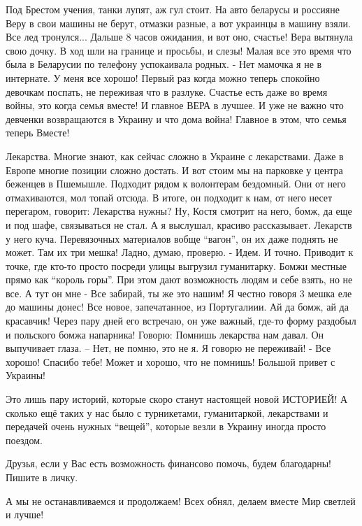 Под Брестом учения, танки лупят, аж гул стоит. На авто беларусы и россияне Веру
в свои машины не берут, отмазки разные, а вот украинцы в машину взяли. Все лед
тронулся... Дальше 8 часов ожидания, и вот оно, счастье! Вера вытянула свою
дочку.  В ход шли  на границе и  просьбы, и слезы!  Малая все это время что
была в Беларусии по телефону успокаивала родных. - Нет мамочка я не в
интернате. У меня все хорошо! Первый раз когда можно теперь спокойно девочкам
поспать, не переживая что в разлуке.  Счастье есть даже во время войны, это
когда семья вместе! И главное ВЕРА в лучшее. И уже не важно что девченки
возвращаются в Украину и что дома война! Главное в этом, что семья теперь
Вместе!

Лекарства. Многие знают, как сейчас сложно  в Украине с лекарствами. Даже в
Европе многие позиции сложно достать. И вот стоим мы на парковке у центра
беженцев в Пшемышле. Подходит рядом к волонтерам бездомный. Они от него
отмахиваются, мол топай отсюда. В итоге, он подходит к нам, от него несет
перегаром, говорит: Лекарства нужны? Ну, Костя смотрит на него, бомж, да еще и
под шафе, связываться не стал. А я выслушал, красиво рассказывает. Лекарств у
него куча. Перевязочных материалов вобще \enquote{вагон}, он их даже поднять не
может.  Там их три мешка! Ладно, думаю, проверю. - Идем. И точно. Приводит к
точке, где кто-то просто посреди улицы выгрузил гуманитарку. Бомжи местные
прямо как \enquote{король горы}. При этом дают возможность людям и себе взять,
но не все. А тут он мне - Все забирай, ты же это нашим! Я честно говоря 3 мешка
еле до машины донес! Все новое, запечатанное, из Португалиии. Ай да бомж, ай да
красавчик!  Через пару дней его встречаю, он уже важный, где-то форму раздобыл
и польского бомжа напарника! Говорю: Помнишь лекарства нам давал. Он
выпучивает глаза. – Нет, не помню, это не я. Я говорю не переживай! - Все
хорошо!  Спасибо тебе!
Может и хорошо, что не помнишь! Большой привет с Украины!

Это лишь пару историй, которые скоро станут настоящей новой  ИСТОРИЕЙ! А
сколько ещё таких у нас  было с турникетами, гуманитаркой, лекарствами и
передачей очень нужных \enquote{вещей},  которые везли в Украину иногда просто
поездом.

Друзья, если у Вас есть возможность финансово помочь, будем благодарны! Пишите в личку.

А мы  не останавливаемся  и продолжаем! Всех обнял, делаем вместе Мир светлей и
лучше!
